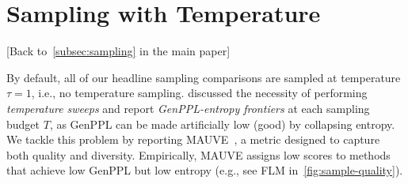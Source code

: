 \documentclass{article}
\begin{document}
\clearpage

%

%

%
%

%

%
%
%
%
%
%

%




%
%
%
%
%
%
%
%
%
%
%
%
%
%
%
%
%
%
%

%
%
%
%

%
%

%
%
%
%

%
%
%

%
%
%

%
%
%
%
%
%

%
%
%
%

%

%
%
%

%
%
%
%
%
%

%
%
%
%
%
%
%
%
%
%

%
%
%
%

%
%
%
%
%
%

%
%
%
%

%
%

%
%
%
%
%
%

%
%
%
%
%

%
%
%

%
%
%

%
%
%
%

%
%
%
%

%
%
%

%
%
%
%
%
%
%
%
%
%
%
%
%
%
%
%
%
%
%
%
%
%

%
%
%
%
%

\clearpage

%
%

%

%
%
%
%
%
%
%
%
%
%
%
%
%
%
%
%
%
%

%

\section{Sampling with Temperature}
\label{app:temp}

[Back to~\cref{subsec:sampling} in the main paper]

By default, all of our headline sampling comparisons are sampled at temperature $\tau = 1$, i.e., no temperature sampling. \citet{pynadath2025candi} discussed the necessity of performing \textit{temperature sweeps} and report \textit{GenPPL-entropy frontiers} at each sampling budget $T$, as GenPPL can be made artificially low (good) by collapsing entropy. We tackle this problem by reporting MAUVE~\citep{pillutla2021mauve}, a metric designed to capture both quality and diversity. Empirically, MAUVE assigns low scores to methods that achieve low GenPPL but low entropy (e.g., see FLM in~\cref{fig:sample-quality}). 
\end{document}
